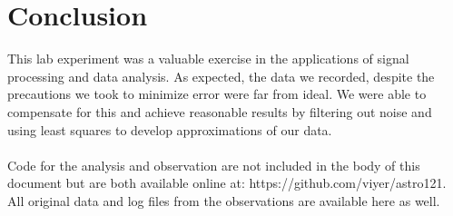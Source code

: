 \documentclass{article}
\begin{document}
    \FloatBarrier
\section{Conclusion}
This lab experiment was a valuable exercise in the applications of signal
processing and data analysis. As expected, the data we recorded, despite the
precautions we took to minimize error were far from ideal. We were able to
compensate for this and achieve reasonable results by filtering out noise and
using least squares to develop approximations of our data.
\\
\\
Code for the analysis and observation are not included in the body of this
document but are both available online at: https://github.com/viyer/astro121.
All original data and log files from the observations are available here as
well.

%   
%   
\end{document}
